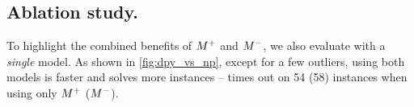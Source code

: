 \subsection{Ablation study.}
To highlight the combined benefits of $M^+$ and $M^-$, we also evaluate \dpy with a \textit{single} model. As shown in \cref{fig:dpy_vs_np}, except for a few outliers, using both models is faster and solves more instances -- \dpy times out on 54 (58) instances when using only $M^+$ ($M^-$).




